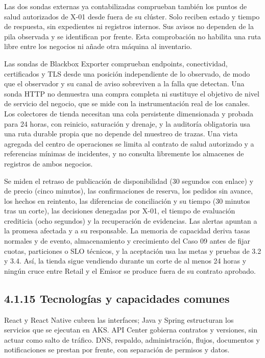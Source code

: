 \documentclass[11pt]{article}
\begin{document}
Las dos sondas externas ya contabilizadas comprueban también los puntos de salud autorizados de X-01 desde fuera de su clúster. Solo reciben estado y tiempo de respuesta, sin expedientes ni registros internos. Sus avisos no dependen de la pila observada y se identifican por frente. Esta comprobación no habilita una ruta libre entre los negocios ni añade otra máquina al inventario.

Las sondas de Blackbox Exporter comprueban endpoints, conectividad, certificados y TLS desde una posición independiente de lo observado, de modo que el observador y su canal de aviso sobreviven a la falla que detectan. Una sonda HTTP no demuestra una compra completa ni sustituye el objetivo de nivel de servicio del negocio, que se mide con la instrumentación real de los canales. Los colectores de tienda necesitan una cola persistente dimensionada y probada para 24 horas, con reinicio, saturación y drenaje, y la auditoría obligatoria usa una ruta durable propia que no depende del muestreo de trazas. Una vista agregada del centro de operaciones se limita al contrato de salud autorizado y a referencias mínimas de incidentes, y no consulta libremente los almacenes de registros de ambos negocios.

Se miden el retraso de publicación de disponibilidad (30 segundos con enlace) y de precio (cinco minutos), las confirmaciones de reserva, los pedidos sin avance, los hechos en reintento, las diferencias de conciliación y su tiempo (30 minutos tras un corte), las decisiones denegadas por X-01, el tiempo de evaluación crediticia (ocho segundos) y la recuperación de evidencias. Las alertas apuntan a la promesa afectada y a su responsable. La memoria de capacidad deriva tasas normales y de evento, almacenamiento y crecimiento del Caso 09 antes de fijar cuotas, particiones o SLO técnicos, y la aceptación usa las metas y pruebas de 3.2 y 3.4. Así, la tienda sigue vendiendo durante un corte de al menos 24 horas y ningún cruce entre Retail y el Emisor se produce fuera de su contrato aprobado.

\subsection{4.1.15 Tecnologías y capacidades comunes}

React y React Native cubren las interfaces; Java y Spring estructuran los servicios que se ejecutan en AKS. API Center gobierna contratos y versiones, sin actuar como salto de tráfico. DNS, respaldo, administración, flujos, documentos y notificaciones se prestan por frente, con separación de permisos y datos.
\end{document}
